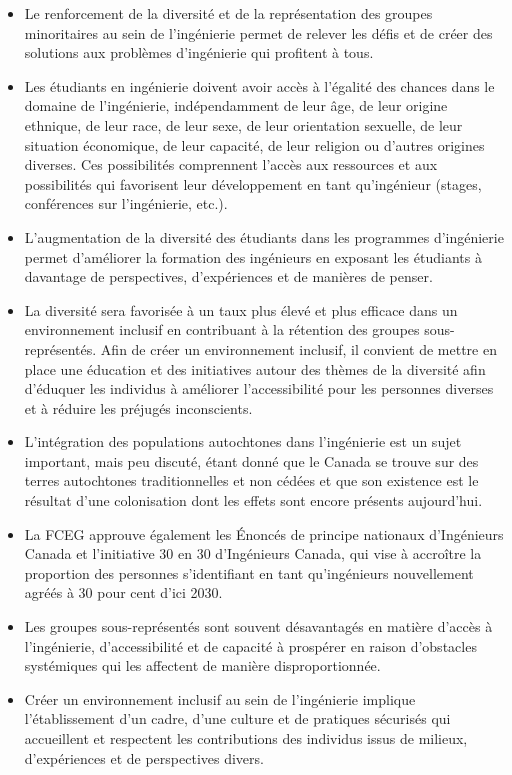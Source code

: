 \begin{itemize}
 \item Le renforcement de la diversité et de la représentation des groupes minoritaires au sein de l'ingénierie permet de relever les défis et de créer des solutions aux problèmes d'ingénierie qui profitent à tous.
 \item Les étudiants en ingénierie doivent avoir accès à l'égalité des chances dans le domaine de l'ingénierie, indépendamment de leur âge, de leur origine ethnique, de leur race, de leur sexe, de leur orientation sexuelle, de leur situation économique, de leur capacité, de leur religion ou d'autres origines diverses. Ces possibilités comprennent l'accès aux ressources et aux possibilités qui favorisent leur développement en tant qu'ingénieur (stages, conférences sur l'ingénierie, etc.).
 \item L'augmentation de la diversité des étudiants dans les programmes d'ingénierie permet d'améliorer la formation des ingénieurs en exposant les étudiants à davantage de perspectives, d'expériences et de manières de penser.
 \item La diversité sera favorisée à un taux plus élevé et plus efficace dans un environnement inclusif en contribuant à la rétention des groupes sous-représentés. Afin de créer un environnement inclusif, il convient de mettre en place une éducation et des initiatives autour des thèmes de la diversité afin d'éduquer les individus à améliorer l'accessibilité pour les personnes diverses et à réduire les préjugés inconscients.
 \item L'intégration des populations autochtones dans l'ingénierie est un sujet important, mais peu discuté, étant donné que le Canada se trouve sur des terres autochtones traditionnelles et non cédées et que son existence est le résultat d'une colonisation dont les effets sont encore présents aujourd'hui.
 \item La FCEG approuve également les Énoncés de principe nationaux d'Ingénieurs Canada et l'initiative 30 en 30 d'Ingénieurs Canada, qui vise à accroître la proportion des personnes s'identifiant en tant qu'ingénieurs nouvellement agréés à 30 pour cent d'ici 2030.
 \item Les groupes sous-représentés sont souvent désavantagés en matière d'accès à l'ingénierie, d'accessibilité et de capacité à prospérer en raison d'obstacles systémiques qui les affectent de manière disproportionnée.
 \item Créer un environnement inclusif au sein de l'ingénierie implique l'établissement d'un cadre, d'une culture et de pratiques sécurisés qui accueillent et respectent les contributions des individus issus de milieux, d'expériences et de perspectives divers.
\end{itemize}


